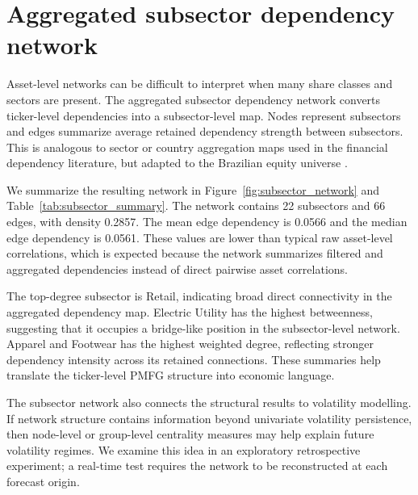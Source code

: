 \section{Aggregated subsector dependency network}
\label{sec:subsector_network}

Asset-level networks can be difficult to interpret when many share classes and sectors are present. The aggregated subsector dependency network converts ticker-level dependencies into a subsector-level map. Nodes represent subsectors and edges summarize average retained dependency strength between subsectors. This is analogous to sector or country aggregation maps used in the financial dependency literature, but adapted to the Brazilian equity universe \cite{raddant_dimatteo_2023}.

We summarize the resulting network in Figure~\ref{fig:subsector_network} and Table~\ref{tab:subsector_summary}. The network contains 22 subsectors and 66 edges, with density 0.2857. The mean edge dependency is 0.0566 and the median edge dependency is 0.0561. These values are lower than typical raw asset-level correlations, which is expected because the network summarizes filtered and aggregated dependencies instead of direct pairwise asset correlations.

The top-degree subsector is Retail, indicating broad direct connectivity in the aggregated dependency map. Electric Utility has the highest betweenness, suggesting that it occupies a bridge-like position in the subsector-level network. Apparel and Footwear has the highest weighted degree, reflecting stronger dependency intensity across its retained connections. These summaries help translate the ticker-level PMFG structure into economic language.

The subsector network also connects the structural results to volatility modelling. If network structure contains information beyond univariate volatility persistence, then node-level or group-level centrality measures may help explain future volatility regimes. We examine this idea in an exploratory retrospective experiment; a real-time test requires the network to be reconstructed at each forecast origin.


